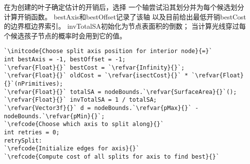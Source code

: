 在为创建的叶子确定估计的开销后，选择
一个轴尝试沿其划分并为每个候选划分计算开销函数。
{\ttfamily bestAxis}和{\ttfamily bestOffset}记录了该轴
以及目前给出最低开销{\ttfamily bestCost}的边界框边界索引。
{\ttfamily invTotalSA}初始化为节点表面积的倒数；
当计算光线穿过每个候选孩子节点的概率时会用到它的值。
\begin{lstlisting}
`\initcode{Choose split axis position for interior node}{=}`
int bestAxis = -1, bestOffset = -1;
`\refvar{Float}{}` bestCost = `\refvar{Infinity}{}`;
`\refvar{Float}{}` oldCost = `\refvar{isectCost}{}` * `\refvar{Float}{}`(nPrimitives);
`\refvar{Float}{}` totalSA = nodeBounds.`\refvar{SurfaceArea}{}`();
`\refvar{Float}{}` invTotalSA = 1 / totalSA;
`\refvar{Vector3f}{}` d = nodeBounds.`\refvar{pMax}{}` - nodeBounds.`\refvar{pMin}{}`;
`\refcode{Choose which axis to split along}{}`
int retries = 0;
retrySplit:
`\refcode{Initialize edges for axis}{}`
`\refcode{Compute cost of all splits for axis to find best}{}`
\end{lstlisting}